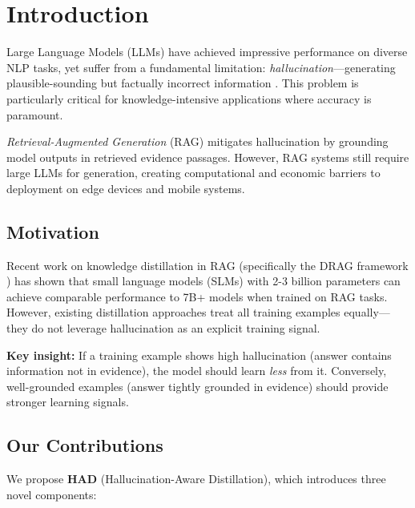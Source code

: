 \documentclass[11pt,a4paper]{article}
\begin{document}
\newpage
\tableofcontents
\newpage

\section{Introduction}

Large Language Models (LLMs) have achieved impressive performance on diverse NLP tasks, yet suffer from a fundamental limitation: \textit{hallucination}—generating plausible-sounding but factually incorrect information \cite{hallucination_survey}. This problem is particularly critical for knowledge-intensive applications where accuracy is paramount.

\textit{Retrieval-Augmented Generation} (RAG) \cite{rag_lewis} mitigates hallucination by grounding model outputs in retrieved evidence passages. However, RAG systems still require large LLMs for generation, creating computational and economic barriers to deployment on edge devices and mobile systems.

\subsection{Motivation}

Recent work on knowledge distillation in RAG (specifically the DRAG framework \cite{drag_2025}) has shown that small language models (SLMs) with 2-3 billion parameters can achieve comparable performance to 7B+ models when trained on RAG tasks. However, existing distillation approaches treat all training examples equally—they do not leverage hallucination as an explicit training signal.

\textbf{Key insight:} If a training example shows high hallucination (answer contains information not in evidence), the model should learn \textit{less} from it. Conversely, well-grounded examples (answer tightly grounded in evidence) should provide stronger learning signals.

\subsection{Our Contributions}

We propose \textbf{HAD} (Hallucination-Aware Distillation), which introduces three novel components:
\end{document}
